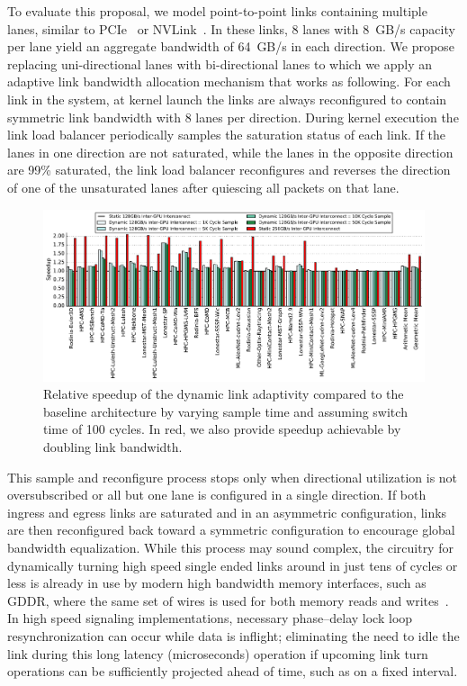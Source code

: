 To evaluate this proposal, we model point-to-point links containing multiple 
lanes, similar to PCIe~\cite{PCIe3.1a} or NVLink~\cite{pascal-tesla-wp}. In these links, 8 
lanes with \SI{8}{GB/s} capacity per lane yield an aggregate bandwidth of \SI{64}{GB/s} in 
each direction. We propose replacing uni-directional lanes with bi-directional 
lanes to which we apply an adaptive link bandwidth allocation mechanism that 
works as following. For each link in the system, at kernel launch the links are 
always reconfigured to contain symmetric link bandwidth with 8 lanes per 
direction. During kernel execution the link load balancer periodically samples 
the saturation status of each link. If the lanes in one direction are not 
saturated, while the lanes in the opposite direction are 99\% saturated, the 
link load balancer reconfigures and reverses the direction of one of the 
unsaturated lanes after quiescing all packets on that lane. 

\begin{figure}[tp]
	\centering
	\includegraphics[width=1.0\textwidth]{figures/plot_nvlink_sample_time.pdf}
	\caption{Relative speedup of the dynamic link adaptivity compared to
		the baseline architecture by varying sample time and assuming switch 
		time of
		100 cycles. In red, we also provide speedup achievable by doubling link 
		bandwidth.}
	\label{fig:sampletime}
\end{figure}

This sample and 
reconfigure process stops only when directional utilization is not 
oversubscribed or all but one lane is configured in a single direction. 
If both ingress and egress links are saturated and in an asymmetric 
configuration, links are then reconfigured back toward a symmetric configuration 
to encourage global bandwidth equalization. While this process may sound 
complex, the circuitry for dynamically turning high speed single ended links 
around in just tens of cycles or less is already in use by modern high bandwidth 
memory interfaces, such as GDDR, where the same set of wires is used for both memory reads 
and writes~\cite{hynixgddr51Gb}. In high speed signaling implementations,
necessary phase--delay lock loop
resynchronization can occur while data is inflight; eliminating the need to idle
the link during this long latency (microseconds) operation if upcoming link turn operations
can be sufficiently projected ahead of time, such as on a fixed interval.

